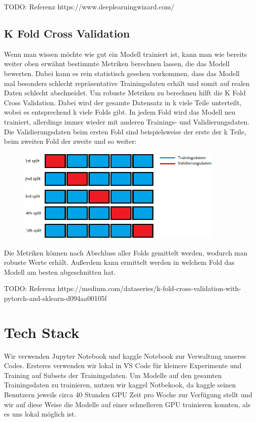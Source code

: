 \documentclass[12pt, a4paper]{article}
\begin{document}
TODO: Referenz https://www.deeplearningwizard.com/

\subsection{K Fold Cross Validation}
Wenn man wissen möchte wie gut ein Modell trainiert ist, kann man wie bereits weiter oben erwähnt bestimmte Metriken berechnen lassen, die das Modell bewerten. Dabei kann es rein statistisch gesehen vorkommen, dass das Modell mal besonders schlecht repräsentative Trainingsdaten erhält und somit auf realen Daten schlecht abschneidet. Um robuste Metriken zu berechnen hilft die K Fold Cross Validation. Dabei wird der gesamte Datensatz in k viele Teile unterteilt, wobei es entsprechend k viele Folds gibt. In jedem Fold wird das Modell neu trainiert, allerdings immer wieder mit anderen Trainings- und Validierungsdaten. Die Validierungsdaten beim ersten Fold sind beispielsweise der erste der k Teile, beim zweiten Fold der zweite und so weiter:
\begin{figure}[h]
\centering
\includegraphics[width=0.9\textwidth]{folds.png}
\end{figure}
Die Metriken können nach Abschluss aller Folds gemittelt werden, wodurch man robuste Werte erhält. Außerdem kann ermittelt werden in welchem Fold das Modell am besten abgeschnitten hat.

TODO: Referenz https://medium.com/dataseries/k-fold-cross-validation-with-pytorch-and-sklearn-d094aa00105f

\section{Tech Stack}
Wir verwenden Jupyter Notebook und kaggle Notebook zur Verwaltung unseres Codes. Ersteres verwenden wir lokal in VS Code für kleinere Experimente und Training auf Subsets der Trainingsdaten. Um Modelle auf den gesamten Trainingsdaten zu trainieren, nutzen wir kaggel Notbekook, da kaggle seinen Benutzern jeweils circa 40 Stunden GPU Zeit pro Woche zur Verfügung stellt und wir auf diese Weise die Modelle auf einer schnelleren GPU trainieren konnten, als es uns lokal möglich ist.
\end{document}

